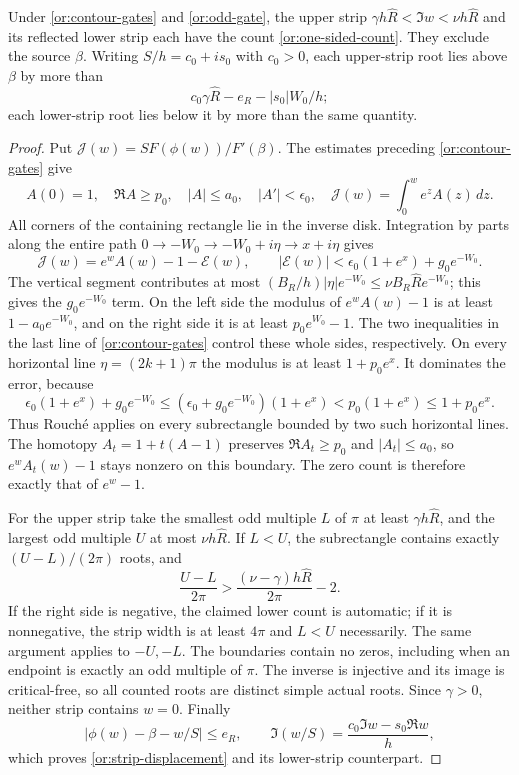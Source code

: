\begin{lemma}\label{or:one-sided}
Under \eqref{or:contour-gates} and \eqref{or:odd-gate}, the upper
strip $\gamma h\widehat R<\Im w<\nu h\widehat R$ and its reflected
lower strip each have the count \eqref{or:one-sided-count}.
They exclude the source $\beta$.  Writing
$S/h=c_0+is_0$ with $c_0>0$, each upper-strip root lies above
$\beta$ by more than
\begin{equation}\label{or:strip-displacement}
                c_0\gamma\widehat R-e_R-|s_0|W_0/h;
\end{equation}
each lower-strip root lies below it by more than the same quantity.
\end{lemma}
\begin{proof}
Put $\mathcal J(w)=SF(\phi(w))/F'(\beta)$.
The estimates preceding \eqref{or:contour-gates} give
\[
 A(0)=1,\quad \Re A\ge p_0,\quad |A|\le a_0,\quad
 |A'|<\epsilon_0,\quad
 \mathcal J(w)=\int_0^w e^zA(z)\,dz.
\]
All corners of the containing rectangle lie in the inverse disk.
Integration by parts along the entire path
$0\longrightarrow-W_0\longrightarrow-W_0+i\eta
 \longrightarrow x+i\eta$ gives
\[
 \mathcal J(w)=e^wA(w)-1-\mathcal E(w),\qquad
 |\mathcal E(w)|<\epsilon_0(1+e^x)+g_0e^{-W_0}.
\]
The vertical segment contributes at most
$(B_R/h)|\eta|e^{-W_0}\le\nu B_R\widehat R e^{-W_0}$;
this gives the $g_0e^{-W_0}$ term.
On the left side the modulus of $e^wA(w)-1$ is at least
$1-a_0e^{-W_0}$, and on the right side it is at least
$p_0e^{W_0}-1$.  The two inequalities in the last line of
\eqref{or:contour-gates} control these whole sides, respectively.
On every horizontal line $\eta=(2k+1)\pi$ the modulus is at least
$1+p_0e^x$.  It dominates the error, because
\[
 \epsilon_0(1+e^x)+g_0e^{-W_0}
 \le(\epsilon_0+g_0e^{-W_0})(1+e^x)
 <p_0(1+e^x)\le1+p_0e^x.
\]
Thus Rouch\'e applies on every subrectangle bounded by two such
horizontal lines.  The homotopy
$A_t=1+t(A-1)$ preserves $\Re A_t\ge p_0$ and $|A_t|\le a_0$,
so $e^wA_t(w)-1$ stays nonzero on this boundary.
The zero count is therefore exactly that of $e^w-1$.

For the upper strip take the smallest odd multiple $L$ of $\pi$
at least $\gamma h\widehat R$, and the largest odd multiple $U$
at most $\nu h\widehat R$.  If $L<U$, the subrectangle contains
exactly $(U-L)/(2\pi)$ roots, and
\[
 \frac{U-L}{2\pi}>
            \frac{(\nu-\gamma)h\widehat R}{2\pi}-2.
\]
If the right side is negative, the claimed lower count is automatic;
if it is nonnegative, the strip width is at least $4\pi$ and
$L<U$ necessarily.  The same argument applies to $-U,-L$.
The boundaries contain no zeros, including when an endpoint is exactly
an odd multiple of $\pi$.  The inverse is injective and its image
is critical-free, so all counted roots are distinct simple actual
roots.  Since $\gamma>0$, neither strip contains $w=0$.
Finally
\[
             |\phi(w)-\beta-w/S|\le e_R,
 \qquad \Im(w/S)=\frac{c_0\Im w-s_0\Re w}{h},
\]
which proves \eqref{or:strip-displacement} and its lower-strip
counterpart.
\end{proof}


